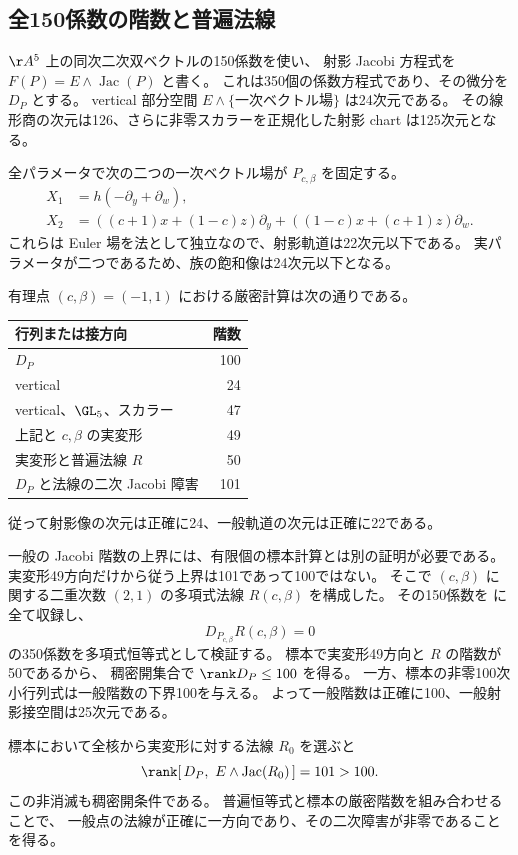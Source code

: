 \subsection{全150係数の階数と普遍法線}

$\AA^5$ 上の同次二次双ベクトルの150係数を使い、
射影 Jacobi 方程式を $F(P)=E\wedge\operatorname{Jac}(P)$ と書く。
これは350個の係数方程式であり、その微分を $D_P$ とする。
vertical 部分空間 $E\wedge\{\text{一次ベクトル場}\}$ は24次元である。
その線形商の次元は126、さらに非零スカラーを正規化した射影 chart は125次元となる。

全パラメータで次の二つの一次ベクトル場が $P_{c,\beta}$ を固定する。
\begin{align*}
 X_1&=h(-\partial_y+\partial_w),\\
 X_2&=((c+1)x+(1-c)z)\partial_y
                +((1-c)x+(c+1)z)\partial_w.
\end{align*}
これらは Euler 場を法として独立なので、射影軌道は22次元以下である。
実パラメータが二つであるため、族の飽和像は24次元以下となる。

有理点 $(c,\beta)=(-1,1)$ における厳密計算は次の通りである。
\begin{center}
\begin{tabular}{lr}
\toprule
行列または接方向&階数\\\midrule
$D_P$&100\\
vertical&24\\
vertical、$\GL_5$、スカラー&47\\
上記と $c,\beta$ の実変形&49\\
実変形と普遍法線 $R$&50\\
$D_P$ と法線の二次 Jacobi 障害&101\\\bottomrule
\end{tabular}
\end{center}
従って射影像の次元は正確に24、一般軌道の次元は正確に22である。

一般の Jacobi 階数の上界には、有限個の標本計算とは別の証明が必要である。
実変形49方向だけから従う上界は101であって100ではない。
そこで $(c,\beta)$ に関する二重次数 $(2,1)$ の多項式法線 $R(c,\beta)$ を構成した。
その150係数を  に全て収録し、
\[
 D_{P_{c,\beta}}R(c,\beta)=0
\]
の350係数を多項式恒等式として検証する。
標本で実変形49方向と $R$ の階数が50であるから、
稠密開集合で $\rank D_P\le100$ を得る。
一方、標本の非零100次小行列式は一般階数の下界100を与える。
よって一般階数は正確に100、一般射影接空間は25次元である。

標本において全核から実変形に対する法線 $R_0$ を選ぶと
\begin{equation}
 \rank[\,D_P,\ E\wedge\operatorname{Jac}(R_0)\,]=101>100.
 \label{eq:cplus-quadratic-obstruction}
\end{equation}
この非消滅も稠密開条件である。
普遍恒等式と標本の厳密階数を組み合わせることで、
一般点の法線が正確に一方向であり、その二次障害が非零であることを得る。

